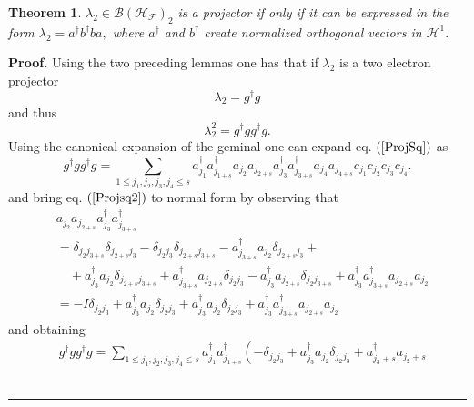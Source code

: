 \documentclass[aps,preprint,amsfonts,amssymb,showpacs,showkeys]{revtex4}%
\newtheorem{theorem}{Theorem}
\newenvironment{proof}[1][Proof]{\noindent\textbf{#1.} }{\ \rule{0.5em}{0.5em}}
\begin{document}
\begin{theorem}
\bigskip$\lambda_{2}\in\mathcal{B}\left(  \mathcal{H}_{\mathcal{F}}\right)
_{2}$ is a projector if only if it can be expressed in the form $\lambda
_{2}=a^{\dagger}b^{\dagger}ba,$ where $a^{\dagger}$ and $b^{\dagger}$ create
normalized orthogonal vectors in $\mathcal{H}^{1}.$
\end{theorem}

\begin{proof}
Using the two preceding lemmas one has that if $\lambda_{2}$ is a two electron
projector
\begin{equation}
\lambda_{2}=g^{\dagger}g\nonumber
\end{equation}
and thus
\begin{equation}
\lambda_{2}^{2}=g^{\dagger}gg^{\dagger}g. \label{ProjSq}%
\end{equation}
Using the canonical expansion of the geminal one can expand eq. $\left(
\ref{ProjSq}\right)  $ as
\begin{equation}
g^{\dagger}gg^{\dagger}g=\sum_{1\leq j_{1},j_{2},j_{3},j_{4}\leq s}a_{j_{1}%
}^{\dagger}a_{j_{1+s}}^{\dagger}a_{j_{2}}a_{j_{2+s}}a_{j_{3}}^{\dagger
}a_{j_{3+s}}^{\dagger}a_{j_{4}}a_{j_{4+s}}c_{j_{1}}c_{j_{2}}c_{j_{3}}c_{j_{4}%
}. \label{Projsq2}%
\end{equation}
and bring eq. $\left(  \ref{Projsq2}\right)  $ to normal form by observing
that
\begin{align}
&  a_{j_{2}}a_{j_{2+s}}a_{j_{3}}^{\dagger}a_{j_{3+s}}^{\dagger}\nonumber\\
&  =\delta_{j_{2}j_{3+s}}\delta_{j_{2+s}j_{3}}-\delta_{j_{2}j_{3}}%
\delta_{j_{2+s}j_{3+s}}-a_{j_{3+s}}^{\dagger}a_{j_{2}}\delta_{j_{2+s}j_{3}%
}+\nonumber\\
&  \quad+a_{j_{3}}^{\dagger}a_{j_{2}}\delta_{j_{2+s}j_{3+s}}+a_{j_{3+s}%
}^{\dagger}a_{j_{2+s}}\delta_{j_{2}j_{3}}-a_{j_{3}}^{\dagger}a_{j_{2+s}}%
\delta_{j_{2}j_{3+s}}+a_{j_{3}}^{\dagger}a_{j_{3+s}}^{\dagger}a_{j_{2+s}%
}a_{j_{2}}\nonumber\\
&  =-I\delta_{j_{2}j_{3}}+a_{j_{3}}^{\dagger}a_{j_{2}}\delta_{j_{2}j_{3}%
}+a_{j_{3}}^{\dagger}a_{j_{2}}\delta_{j_{2}j_{3}}+a_{j_{3}}^{\dagger
}a_{j_{3+s}}^{\dagger}a_{j_{2+s}}a_{j_{2}}%
\end{align}
and obtaining%
\begin{align}
&  g^{\dagger}gg^{\dagger}g=\sum_{1\leq j_{1},j_{2},j_{3},j_{4}\leq s}%
a_{j_{1}}^{\dagger}a_{j_{1+s}}^{\dagger}\left(  -\delta_{j_{2}j_{3}}+a_{j_{3}%
}^{\dagger}a_{j_{2}}\delta_{j_{2}j_{3}}+a_{j_{3}+s}^{\dagger}a_{j_{2}+s}%

\end{align}
\end{proof}
\end{document}
